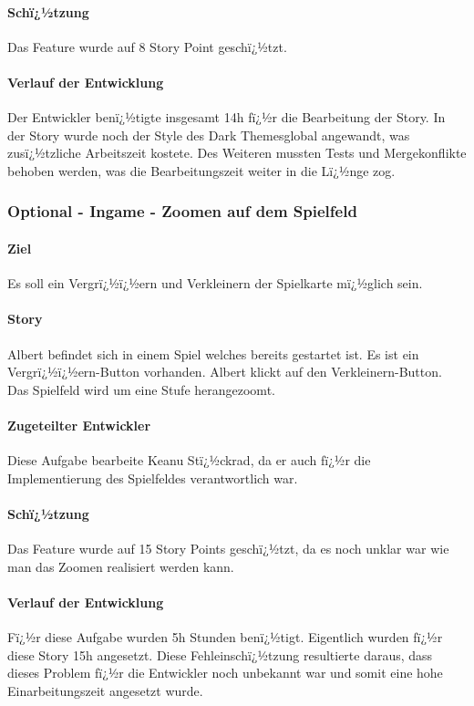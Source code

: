 \documentclass[12pt, titlepage]{scrartcl}
\begin{document}
			\paragraph{Schï¿½tzung}
			Das Feature wurde auf 8 Story Point geschï¿½tzt.
			\paragraph{Verlauf der Entwicklung} 
			Der Entwickler benï¿½tigte insgesamt 14h fï¿½r die Bearbeitung der Story. In der Story wurde noch der Style des \glqq Dark Themes\grqq global angewandt, was zusï¿½tzliche Arbeitszeit kostete. Des Weiteren mussten Tests und Mergekonflikte behoben werden, was die Bearbeitungszeit weiter in die Lï¿½nge zog.
			 
			\subsubsection{Optional - Ingame - Zoomen auf dem Spielfeld}
			\paragraph{Ziel} Es soll ein Vergrï¿½ï¿½ern und Verkleinern der Spielkarte mï¿½glich sein.
			\paragraph{Story}Albert befindet sich in einem Spiel welches bereits gestartet ist. Es ist ein Vergrï¿½ï¿½ern-Button vorhanden. Albert klickt auf den  Verkleinern-Button. Das Spielfeld wird um eine Stufe herangezoomt.
			\paragraph{Zugeteilter Entwickler} Diese Aufgabe bearbeite Keanu Stï¿½ckrad, da er auch fï¿½r die Implementierung des Spielfeldes verantwortlich war.
			\paragraph{Schï¿½tzung}
			Das Feature wurde auf 15 Story Points geschï¿½tzt, da es noch unklar war wie man das Zoomen realisiert werden kann.
			\paragraph{Verlauf der Entwicklung} 
			Fï¿½r diese Aufgabe wurden 5h Stunden benï¿½tigt. Eigentlich wurden fï¿½r diese Story 15h angesetzt. Diese Fehleinschï¿½tzung resultierte daraus, dass dieses Problem fï¿½r die Entwickler noch unbekannt war und somit eine hohe Einarbeitungszeit angesetzt wurde.
			
\end{document}
